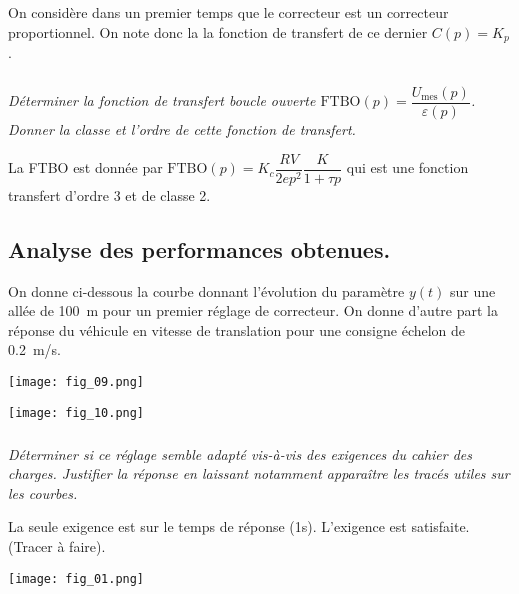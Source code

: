 \begin{multicols}{2}
On considère dans un premier temps que le correcteur est un correcteur proportionnel. On note donc la la fonction de transfert de ce dernier $C(p) = K_p$.


\subparagraph{}
\textit{Déterminer la fonction de transfert boucle ouverte $\text{FTBO}(p)=\dfrac{U_{\text{mes}} (p)}{\varepsilon(p)}$.
Donner la classe et l’ordre de cette fonction de transfert. }
\ifprof
\begin{corrige}
La FTBO est donnée par $\text{FTBO}(p) = K_c \dfrac{RV}{2ep^2} \dfrac{K}{1+\tau p}$ qui est une fonction transfert d'ordre 3 et de classe 2. 
\end{corrige}
\else
\fi

\subsection*{Analyse des performances obtenues.}
\ifprof
\else
On donne ci-dessous la courbe donnant l’évolution du paramètre $y(t)$ sur une allée de \SI{100}{m} pour un premier réglage de correcteur. On donne d’autre part la réponse du véhicule en vitesse de translation pour une consigne échelon de \SI{0,2}{m/s}. 

\begin{center}
\texttt{[image: fig\_09.png]}
\end{center}


\begin{center}
\texttt{[image: fig\_10.png]}
\end{center}

\fi

\subparagraph{}
\textit{Déterminer si ce réglage semble adapté vis-à-vis des exigences du cahier des charges. Justifier la réponse en laissant notamment apparaître les tracés utiles sur les courbes. }
\ifprof
\begin{corrige}
La seule exigence est sur le temps de réponse (1s). L'exigence est satisfaite. (Tracer à faire). 
\end{corrige}
\else
\fi

\end{multicols}

\ifprof
\else
\begin{center}
\texttt{[image: fig\_01.png]}
\end{center}
\fi